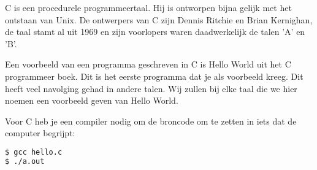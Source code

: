 C is een procedurele programmeertaal. Hij is ontworpen bijna gelijk met het ontstaan van Unix. De ontwerpers van C zijn Dennis Ritchie en Brian Kernighan, de taal stamt al uit 1969 en zijn voorlopers waren daadwerkelijk de talen 'A' en 'B'.

Een voorbeeld van een programma geschreven in C is Hello World uit het C programmeer boek. Dit is het eerste programma dat je als voorbeeld kreeg. Dit heeft veel navolging gehad in andere talen. Wij zullen bij elke taal die we hier noemen een voorbeeld geven van Hello World.


Voor C heb je een compiler nodig om de broncode om te zetten in iets dat de computer begrijpt:
\begin{lstlisting}[language=bash]
$ gcc hello.c
$ ./a.out
\end{lstlisting}

